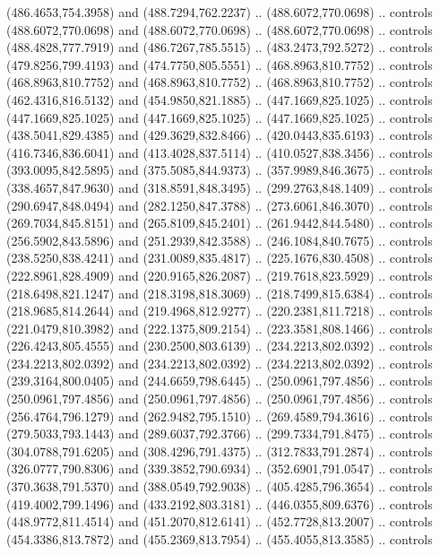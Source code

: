 \begin{scope}[shift={(-162.56685,-567.58888)}]
\begin{scope}
      (486.4653,754.3958) and (488.7294,762.2237) .. (488.6072,770.0698) .. controls
      (488.6072,770.0698) and (488.6072,770.0698) .. (488.6072,770.0698) .. controls
      (488.4828,777.7919) and (486.7267,785.5515) .. (483.2473,792.5272) .. controls
      (479.8256,799.4193) and (474.7750,805.5551) .. (468.8963,810.7752) .. controls
      (468.8963,810.7752) and (468.8963,810.7752) .. (468.8963,810.7752) .. controls
      (462.4316,816.5132) and (454.9850,821.1885) .. (447.1669,825.1025) .. controls
      (447.1669,825.1025) and (447.1669,825.1025) .. (447.1669,825.1025) .. controls
      (438.5041,829.4385) and (429.3629,832.8466) .. (420.0443,835.6193) .. controls
      (416.7346,836.6041) and (413.4028,837.5114) .. (410.0527,838.3456) .. controls
      (393.0095,842.5895) and (375.5085,844.9373) .. (357.9989,846.3675) .. controls
      (338.4657,847.9630) and (318.8591,848.3495) .. (299.2763,848.1409) .. controls
      (290.6947,848.0494) and (282.1250,847.3788) .. (273.6061,846.3070) .. controls
      (269.7034,845.8151) and (265.8109,845.2401) .. (261.9442,844.5480) .. controls
      (256.5902,843.5896) and (251.2939,842.3588) .. (246.1084,840.7675) .. controls
      (238.5250,838.4241) and (231.0089,835.4817) .. (225.1676,830.4508) .. controls
      (222.8961,828.4909) and (220.9165,826.2087) .. (219.7618,823.5929) .. controls
      (218.6498,821.1247) and (218.3198,818.3069) .. (218.7499,815.6384) .. controls
      (218.9685,814.2644) and (219.4968,812.9277) .. (220.2381,811.7218) .. controls
      (221.0479,810.3982) and (222.1375,809.2154) .. (223.3581,808.1466) .. controls
      (226.4243,805.4555) and (230.2500,803.6139) .. (234.2213,802.0392) .. controls
      (234.2213,802.0392) and (234.2213,802.0392) .. (234.2213,802.0392) .. controls
      (239.3164,800.0405) and (244.6659,798.6445) .. (250.0961,797.4856) .. controls
      (250.0961,797.4856) and (250.0961,797.4856) .. (250.0961,797.4856) .. controls
      (256.4764,796.1279) and (262.9482,795.1510) .. (269.4589,794.3616) .. controls
      (279.5033,793.1443) and (289.6037,792.3766) .. (299.7334,791.8475) .. controls
      (304.0788,791.6205) and (308.4296,791.4375) .. (312.7833,791.2874) .. controls
      (326.0777,790.8306) and (339.3852,790.6934) .. (352.6901,791.0547) .. controls
      (370.3638,791.5370) and (388.0549,792.9038) .. (405.4285,796.3654) .. controls
      (419.4002,799.1496) and (433.2192,803.3181) .. (446.0355,809.6376) .. controls
      (448.9772,811.4514) and (451.2070,812.6141) .. (452.7728,813.2007) .. controls
      (454.3386,813.7872) and (455.2369,813.7954) .. (455.4055,813.3585) .. controls

\end{scope}
\end{scope}
